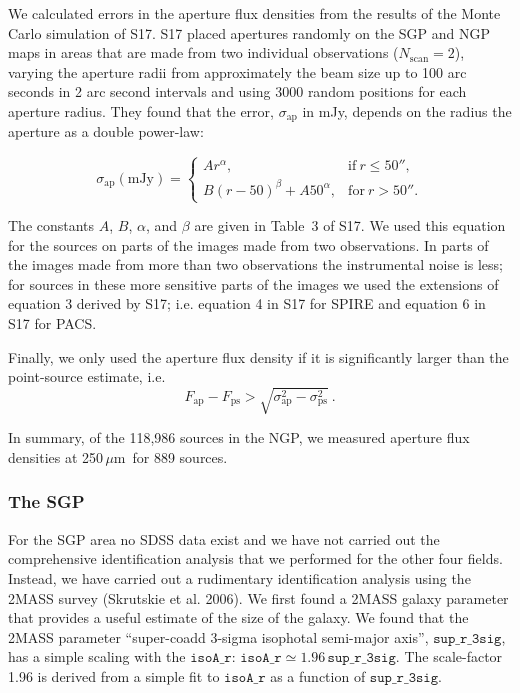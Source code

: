 \documentclass[a4paper,fleqn,usenatbib, twocolumn]{aastex61}
\def\mic{\,$\mu $m}
\begin{document}
We calculated errors in the aperture flux densities from the results
of the Monte Carlo simulation of S17. S17 placed apertures randomly on
the SGP and NGP maps in areas that are made from two individual
observations ($N_{\mathrm{scan}}=2$), varying the aperture radii from
approximately the beam size up to 100 arc seconds in 2 arc second
intervals and using 3000 random positions for each aperture radius.
They found that the error, $\sigma_{\mathrm{ap}}$ in mJy, depends on
the radius the aperture as a double power-law:

\begin{equation}
  \sigma_{\mathrm{ap}}(\mathrm{mJy}) =
  \begin{cases}
      Ar^\alpha , &   \mathrm{if\ } r\le 50'' ,\\
      B(r-50)^\beta + A 50^\alpha , & \mathrm{for\ } r>50''.
    \end{cases}
\end{equation}

The constants $A$, $B$, $\alpha$, and $\beta$ are given in Table~3 of
S17.  We used this equation for the sources on parts of the images
made from two observations. In parts of the images made from more than
two observations the instrumental noise is less; for sources in these
more sensitive parts of the images we used the extensions of equation
3 derived by S17; i.e. equation 4 in S17 for SPIRE and equation 6 in
S17 for PACS.

Finally, we only used the aperture flux density if
it is significantly larger than the point-source estimate, i.e.
\begin{equation}
F_\mathrm{ap}- F_\mathrm{ps}>\sqrt{\sigma_\mathrm{ap}^2-\sigma_\mathrm{ps}^2}
\ .
\end{equation}

In summary, of the 118,986 sources in the NGP, we measured aperture
flux densities at 250\mic\ for 889 sources. 

\subsubsection{The SGP}

For the SGP area no SDSS data exist and we have not carried out the
comprehensive identification analysis that we performed for the other
four fields. Instead, we have carried out a rudimentary identification
analysis using the 2MASS survey (Skrutskie et al. 2006). We first
found a 2MASS galaxy parameter that provides a useful estimate of the
size of the galaxy. We found that the 2MASS parameter ``super-coadd
3-sigma isophotal semi-major axis'', $\mathtt{sup\_r\_3sig}$, has a
simple scaling with the $\mathtt {isoA\_r}$:
$\mathtt{isoA\_r} \simeq 1.96\, \mathtt{sup\_r\_3sig}$.  The
scale-factor 1.96 is derived from a simple fit to $\mathtt{isoA\_r}$
as a function of $\mathtt{sup\_r\_3sig}$.
  
\end{document}
